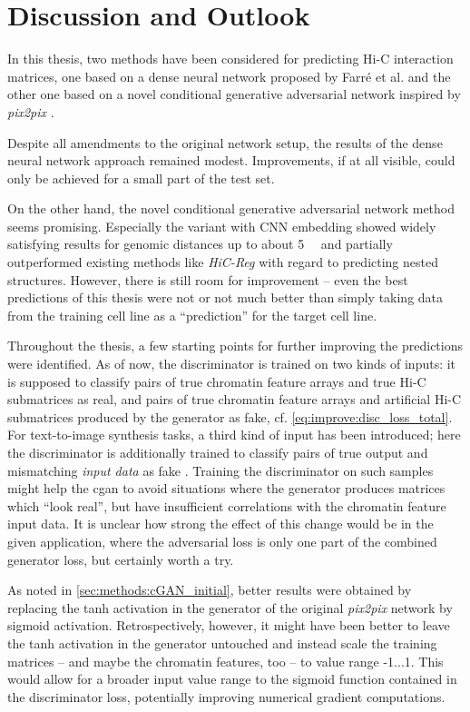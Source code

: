 \section{Discussion and Outlook}
In this thesis, two methods have been considered for predicting Hi-C interaction matrices,
one based on a dense neural network proposed by Farr\'e et al. \cite{Farre2018a} and the other one based on a novel conditional generative adversarial network
inspired by \emph{pix2pix} \cite{Isola2017}.

Despite all amendments to the original network setup,
the results of the dense neural network approach remained modest.
Improvements, if at all visible, could only be achieved for a small part of the test set.

On the other hand, the novel conditional generative adversarial network method seems promising.
Especially the variant with CNN embedding showed widely satisfying results for genomic distances up to about \SI{5}{\mega\bp}
and partially outperformed existing methods like \emph{HiC-Reg} \cite{Zhang2019} with regard to predicting nested structures.
However, there is still room for improvement -- even the best predictions of this thesis were not or not much better 
than simply taking data from the training cell line as a ``prediction'' for the target cell line.

Throughout the thesis, a few starting points for further improving the predictions were identified.
As of now, the discriminator is trained on two kinds of inputs:
it is supposed to classify pairs of true chromatin feature arrays and true Hi-C submatrices as real, 
and pairs of true chromatin feature arrays and artificial Hi-C submatrices produced by the generator as fake, cf. \cref{eq:improve:disc_loss_total}.
For text-to-image synthesis tasks, a third kind of input has been introduced; here the discriminator is additionally trained 
to classify pairs of true output and mismatching \emph{input data} as fake \cite{Reed2016}.
Training the discriminator on such samples might help the \acrshort{cgan} to avoid situations 
where the generator produces matrices which ``look real'', 
but have insufficient correlations with the chromatin feature input data.
It is unclear how strong the effect of this change would be in the given application, 
where the adversarial loss is only one part of the combined generator loss, but certainly worth a try.

As noted in \cref{sec:methods:cGAN_initial}, better results were obtained by replacing the tanh activation in the generator 
of the original \emph{pix2pix} network by sigmoid activation.
Retrospectively, however, it might have been better to leave the tanh activation in the generator untouched
and instead scale the training matrices -- and maybe the chromatin features, too -- to value range -1...1.
This would allow for a broader input value range to the sigmoid function contained in the discriminator loss,
potentially improving numerical gradient computations.

